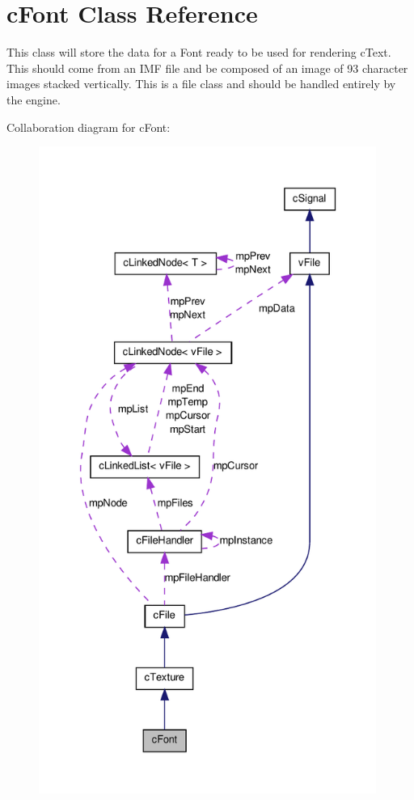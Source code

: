 \hypertarget{classc_font}{
\section{cFont Class Reference}
\label{classc_font}
}


This class will store the data for a Font ready to be used for rendering cText. This should come from an IMF file and be composed of an image of 93 character images stacked vertically. This is a file class and should be handled entirely by the engine.  




Collaboration diagram for cFont:\nopagebreak
\begin{figure}[H]
\begin{center}
\leavevmode
\includegraphics[height=600pt]{classc_font__coll__graph}
\end{center}
\end{figure}
